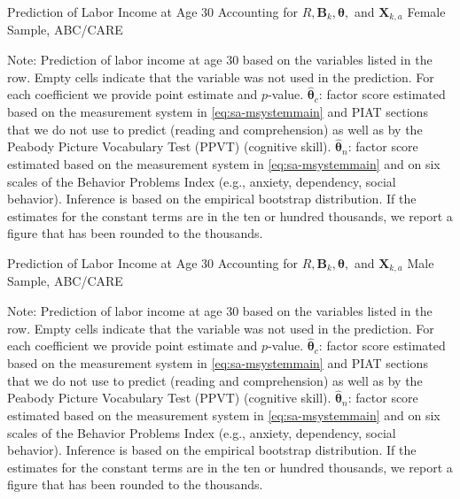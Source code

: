 \begin{table}
\begin{threeparttable}
\caption{Prediction of Labor Income at Age 30 Accounting for $R, \bm{B}_k, \bm{\theta},$ and $\bm{X}_{k,a}$ Female Sample, ABC/CARE}
\label{table:end2}
\centering
\scriptsize

\begin{tablenotes}
\footnotesize
\item Note: Prediction of labor income at age 30 based on the variables listed in the row. Empty cells indicate that the variable was not used in the prediction. For each coefficient we provide point estimate and $p$-value. $\hat{\bm{\theta}}_{c}$: factor score estimated based on the measurement system in \eqref{eq:sa-msystemmain} and PIAT sections that we do not use to predict (reading and comprehension) as well as by the Peabody Picture Vocabulary Test (PPVT) (cognitive skill). $\hat{\bm{\theta}}_{n}$: factor score estimated based on the measurement system in \eqref{eq:sa-msystemmain} and on six scales of the Behavior Problems Index (e.g., anxiety, dependency, social behavior). Inference is based on the empirical bootstrap distribution. If the estimates for the constant terms are in the ten or hundred thousands, we report a figure that has been rounded to the thousands.
\end{tablenotes}
\end{threeparttable}
\end{table}

\begin{table}
\begin{threeparttable}
\caption{Prediction of Labor Income at Age 30 Accounting for $R, \bm{B}_k, \bm{\theta},$ and $\bm{X}_{k,a}$ Male Sample, ABC/CARE}
\label{table:end2}
\centering
\scriptsize

\begin{tablenotes}
\footnotesize
\item Note: Prediction of labor income at age 30 based on the variables listed in the row. Empty cells indicate that the variable was not used in the prediction. For each coefficient we provide point estimate and $p$-value. $\hat{\bm{\theta}}_{c}$: factor score estimated based on the measurement system in \eqref{eq:sa-msystemmain} and PIAT sections that we do not use to predict (reading and comprehension) as well as by the Peabody Picture Vocabulary Test (PPVT) (cognitive skill). $\hat{\bm{\theta}}_{n}$: factor score estimated based on the measurement system in \eqref{eq:sa-msystemmain} and on six scales of the Behavior Problems Index (e.g., anxiety, dependency, social behavior). Inference is based on the empirical bootstrap distribution. If the estimates for the constant terms are in the ten or hundred thousands, we report a figure that has been rounded to the thousands.
\end{tablenotes}
\end{threeparttable}
\end{table}



